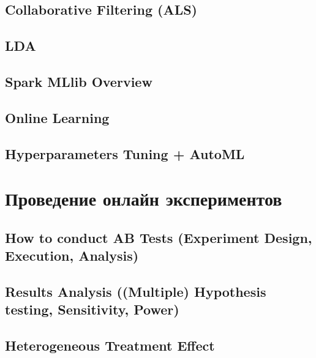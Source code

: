 \documentclass[openany,12pt]{book}
\numberwithin{equation}{section}
\begin{document}
\chapter{Collaborative Filtering (ALS)}

\chapter{LDA}

\chapter{Spark MLlib Overview}

\chapter{Online Learning}

\chapter{Hyperparameters Tuning + AutoML}

\part{Проведение онлайн экспериментов}
\chapter{How to conduct AB Tests (Experiment Design, Execution, Analysis)}

\chapter{Results Analysis ((Multiple) Hypothesis testing, Sensitivity, Power)}

\chapter{Heterogeneous Treatment Effect}

\nocite{*}




\end{document}
